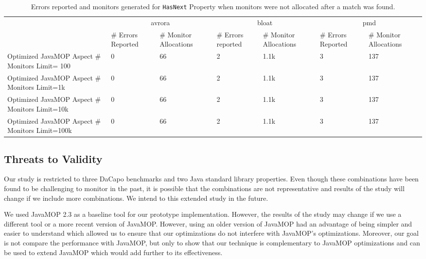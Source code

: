 \begin{table*}[ht]
\centering
\scriptsize
\begin{tabular}{|p{3.7cm}|p{1.2cm}|p{1.5cm}|p{1.2cm}|p{1.5cm}|p{1.2cm}|p{1.5cm}|
}
\hline
\multirow{2}{*}{}               & \multicolumn{2}{c|}{avrora}             & 
\multicolumn{2}{c|}{bloat}            & \multicolumn{2}{c|}{pmd}              \\ 
\cline{2-7} 
                                       & \# Errors Reported  & \# Monitor 
Allocations & \# Errors reported & \# Monitor Allocations& \# Errors Reported & 
\# Monitor Allocations\\ \hline
Optimized JavaMOP Aspect \# Monitors Limit= 100            & 0             & 66  
          & 2           & 1.1k              & 3               & 137     \\ 
\hline
Optimized JavaMOP Aspect \# Monitors Limit=1k           & 0             & 66     
      & 2            & 1.1k              & 3               & 137       \\ \hline
Optimized JavaMOP Aspect \# Monitors Limit=10k        & 0             & 66      
     & 2            & 1.1k              & 3               &137       \\ \hline
Optimized JavaMOP Aspect \# Monitors Limit=100k      & 0             & 66       
    & 2            & 1.1k              & 3               & 137       \\ \hline
\end{tabular}
\caption{Errors reported and monitors generated for \texttt{HasNext} Property 
when monitors were not allocated after a match was found.}
\end{table*}
\label{table:errorreporting2}


\subsection{Threats to Validity}
\label{subsec:threats}

Our study is restricted to three DaCapo benchmarks and two Java standard library 
properties. Even though these combinations have been found to be challenging to 
monitor in the past, it is possible that the combinations are not representative 
and results of the study will change if we include more combinations. We intend 
to this extended study in the future.

We used JavaMOP 2.3 as a baseline tool for our prototype implementation. 
However, the results of the study may change if we use a different tool or a 
more recent version of JavaMOP. However, using an older version of JavaMOP had 
an advantage of being simpler and easier to understand which allowed us to 
ensure that our optimizations do not interfere with JavaMOP's optimizations. 
Moreover, our goal is not compare the performance with JavaMOP, but only to show 
that our technique is complementary to JavaMOP optimizations and can be used to 
extend JavaMOP which would add further to its effectiveness.

